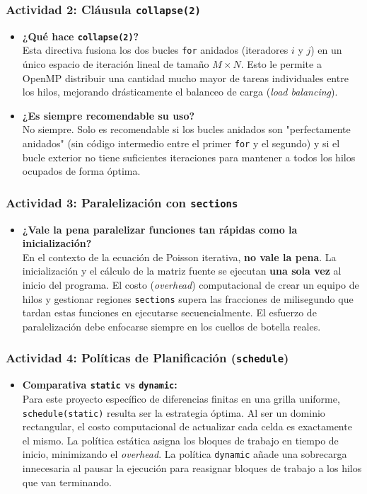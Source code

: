 \subsubsection*{Actividad 2: Cláusula \texttt{collapse(2)}}
\begin{itemize}
    \item \textbf{¿Qué hace \texttt{collapse(2)}?} \\
    Esta directiva fusiona los dos bucles \texttt{for} anidados (iteradores $i$ y $j$) en un único espacio de iteración lineal de tamaño $M \times N$. Esto le permite a OpenMP distribuir una cantidad mucho mayor de tareas individuales entre los hilos, mejorando drásticamente el balanceo de carga (\textit{load balancing}).
    \item \textbf{¿Es siempre recomendable su uso?} \\
    No siempre. Solo es recomendable si los bucles anidados son "perfectamente anidados" (sin código intermedio entre el primer \texttt{for} y el segundo) y si el bucle exterior no tiene suficientes iteraciones para mantener a todos los hilos ocupados de forma óptima.
\end{itemize}

\subsubsection*{Actividad 3: Paralelización con \texttt{sections}}
\begin{itemize}
    \item \textbf{¿Vale la pena paralelizar funciones tan rápidas como la inicialización?} \\
    En el contexto de la ecuación de Poisson iterativa, \textbf{no vale la pena}. La inicialización y el cálculo de la matriz fuente se ejecutan \textbf{una sola vez} al inicio del programa. El costo (\textit{overhead}) computacional de crear un equipo de hilos y gestionar regiones \texttt{sections} supera las fracciones de milisegundo que tardan estas funciones en ejecutarse secuencialmente. El esfuerzo de paralelización debe enfocarse siempre en los cuellos de botella reales.
\end{itemize}

\subsubsection*{Actividad 4: Políticas de Planificación (\texttt{schedule})}
\begin{itemize}
    \item \textbf{Comparativa \texttt{static} vs \texttt{dynamic}:} \\
    Para este proyecto específico de diferencias finitas en una grilla uniforme, \texttt{schedule(static)} resulta ser la estrategia óptima. Al ser un dominio rectangular, el costo computacional de actualizar cada celda es exactamente el mismo. La política estática asigna los bloques de trabajo en tiempo de inicio, minimizando el \textit{overhead}. La política \texttt{dynamic} añade una sobrecarga innecesaria al pausar la ejecución para reasignar bloques de trabajo a los hilos que van terminando.
\end{itemize}

